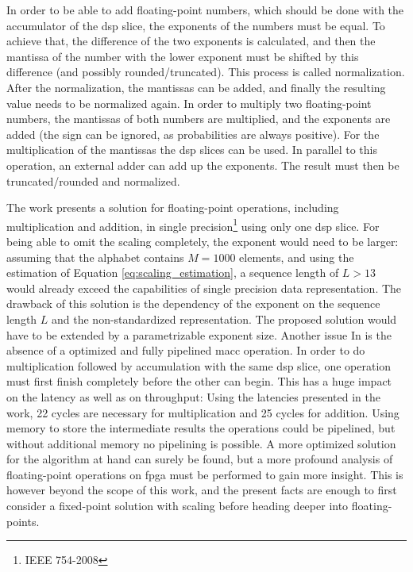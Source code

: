 \documentclass[mscthesis]{usiinfthesis}
\begin{document}
In order to be able to add floating-point numbers, which should be done with the
accumulator of the \gls{dsp} slice, the exponents of the numbers must be equal.
To achieve that, the difference of the two exponents is calculated, and then the
mantissa of the number with the lower exponent must be shifted by this
difference (and possibly rounded/truncated). This process is called
normalization. After the normalization, the mantissas can be added, and finally
the resulting value needs to be normalized again. In order to multiply two
floating-point numbers, the mantissas of both numbers are multiplied, and the
exponents are added (the sign can be ignored, as probabilities are always
positive). For the multiplication of the mantissas the \gls{dsp} slices can be
used. In parallel to this operation, an external adder can add up the
exponents. The result must then be truncated/rounded and normalized.

The work \cite{FPL13_Brosser} presents a solution for floating-point
operations, including multiplication and addition, in single
precision\footnote{IEEE 754-2008} using only one \gls{dsp} slice. For being
able to omit the scaling completely, the exponent would need to be larger:
assuming that the alphabet contains $M=1000$ elements, and using the estimation
of Equation \ref{eq:scaling_estimation}, a sequence length of $L>13$ would
already exceed the capabilities of single precision data representation. The
drawback of this solution is the dependency of the exponent on the sequence
length $L$ and the non-standardized representation. The proposed solution would
have to be extended by a parametrizable exponent size. Another issue In
\cite{FPL13_Brosser} is the absence of a optimized and fully pipelined
\gls{macc} operation.  In order to do multiplication followed by accumulation
with the same \gls{dsp} slice, one operation must first finish completely
before the other can begin. This has a huge impact on the latency as well as on
throughput: Using the latencies presented in the work, 22 cycles are necessary
for multiplication and 25 cycles for addition. Using memory to store the
intermediate results the operations could be pipelined, but without additional
memory no pipelining is possible. A more optimized solution for the algorithm
at hand can surely be found, but a more profound analysis of floating-point
operations on \gls{fpga} must be performed to gain more insight. This is
however beyond the scope of this work, and the present facts are enough to
first consider a fixed-point solution with scaling before heading deeper into
floating-points.
\end{document}
